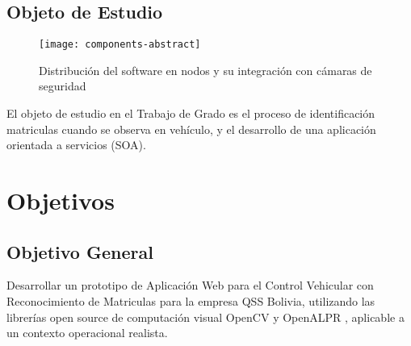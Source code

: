     \subsection{Objeto de Estudio}
        \begin{figure}[h]
            \centering
            \texttt{[image: components-abstract]}
            \caption{Distribución del software en nodos y su integración con cámaras de seguridad}
            \label{fig:components-abstract}
        \end{figure}
        El objeto de estudio en el Trabajo de Grado es el proceso de identificación matriculas cuando se observa en vehículo, y el desarrollo de una aplicación orientada a servicios (SOA).

\color{black}
\section{Objetivos}

    \subsection{Objetivo General}
    Desarrollar un prototipo de Aplicación Web para el Control Vehicular con Reconocimiento de Matriculas para la empresa QSS Bolivia, utilizando las librerías open source de computación visual OpenCV  y OpenALPR ,  aplicable a un contexto operacional realista.
